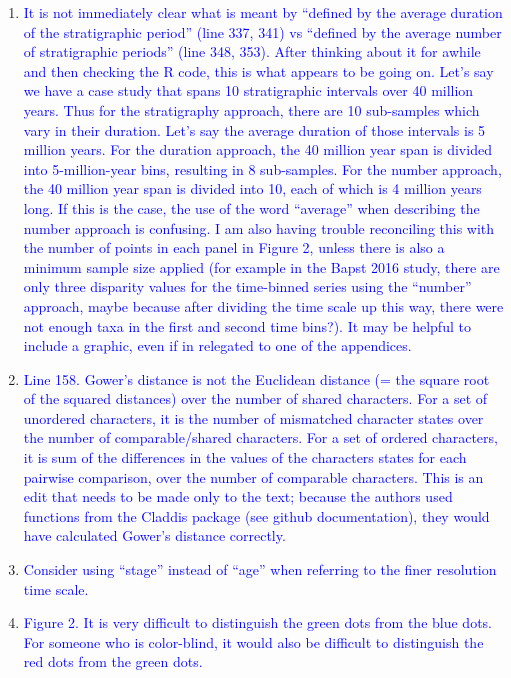 \documentclass[12pt,letterpaper]{article}
\begin{document}
\begin{enumerate}

\item{\textcolor{blue}{It is not immediately clear what is meant by ``defined by the average duration of the stratigraphic period'' (line 337, 341) vs ``defined by the average number of stratigraphic periods'' (line 348, 353). After thinking about it for awhile and then checking the R code, this is what appears to be going on. Let’s say we have a case study that spans 10 stratigraphic intervals over 40 million years. Thus for the stratigraphy approach, there are 10 sub-samples which vary in their duration. Let’s say the average duration of those intervals is 5 million years. For the duration approach, the 40 million year span is divided into 5-million-year bins, resulting in 8 sub-samples. For the number approach, the 40 million year span is divided into 10, each of which is 4 million years long. If this is the case, the use of the word ``average'' when describing the number approach is confusing. I am also having trouble reconciling this with the number of points in each panel in Figure 2, unless there is also a minimum sample size applied (for example in the Bapst 2016 study, there are only three disparity values for the time-binned series using the ``number'' approach, maybe because after dividing the time scale up this way, there were not enough taxa in the first and second time bins?). It may be helpful to include a graphic, even if in relegated to one of the appendices.}}


\item{\textcolor{blue}{Line 158. Gower’s distance is not the Euclidean distance (= the square root of the squared distances) over the number of shared characters. For a set of unordered characters, it is the number of mismatched character states over the number of comparable/shared characters. For a set of ordered characters, it is sum of the differences in the values of the characters states for each pairwise comparison, over the number of comparable characters. This is an edit that needs to be made only to the text; because the authors used functions from the Claddis package (see github documentation), they would have calculated Gower’s distance correctly.}}


\item{\textcolor{blue}{Consider using ``stage'' instead of ``age'' when referring to the finer resolution time scale.}}


\item{\textcolor{blue}{Figure 2. It is very difficult to distinguish the green dots from the blue dots. For someone who is color-blind, it would also be difficult to distinguish the red dots from the green dots.}}


\end{enumerate}
\end{document}
